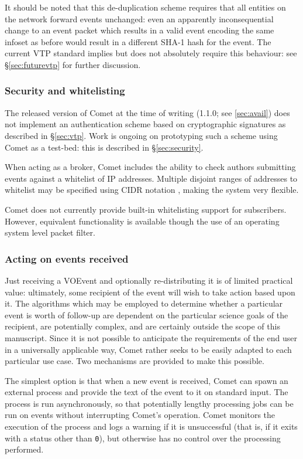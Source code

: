\documentclass[5p,authoryear]{elsarticle}
\begin{document}
It should be noted that this de-duplication scheme requires that all entities
on the network forward events unchanged: even an apparently inconsequential
change to an event packet which results in a valid event encoding the same
infoset as before would result in a different SHA-1 hash for the event. The
current VTP standard implies but does not absolutely require this behaviour:
see \S\ref{sec:futurevtp} for further discussion.

\subsubsection{Security and whitelisting}
\label{sec:design:security}

The released version of Comet at the time of writing (1.1.0; see
\ref{sec:avail}) does not implement an authentication scheme based on
cryptographic signatures as described in \S\ref{sec:vtp}. Work is ongoing on
prototyping such a scheme using Comet as a test-bed: this is described in
\S\ref{sec:security}.

When acting as a broker, Comet includes the ability to check authors
submitting events against a whitelist of IP addresses. Multiple disjoint
ranges of addresses to whitelist may be specified using CIDR notation
\citep{Fuller:1993}, making the system very flexible.

Comet does not currently provide built-in whitelisting support for
subscribers. However, equivalent functionality is available though the use of
an operating system level packet filter.

\subsubsection{Acting on events received}
\label{sec:design:plugin}

Just receiving a VOEvent and optionally re-distributing it is of limited
practical value: ultimately, some recipient of the event will wish to take
action based upon it. The algorithms which may be employed to determine
whether a particular event is worth of follow-up are dependent on the
particular science goals of the recipient, are potentially complex, and are
certainly outside the scope of this manuscript. Since it is not possible to
anticipate the requirements of the end user in a universally applicable way,
Comet rather seeks to be easily adapted to each particular use case. Two
mechanisms are provided to make this possible.

The simplest option is that when a new event is received, Comet can spawn an
external process and provide the text of the event to it on standard input.
The process is run asynchronously, so that potentially lengthy processing jobs
can be run on events without interrupting Comet's operation. Comet monitors
the execution of the process and logs a warning if it is unsuccessful (that
is, if it exits with a status other than \texttt{0}), but otherwise has no
control over the processing performed.
\end{document}
